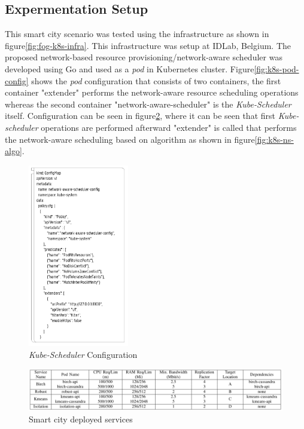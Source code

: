 \subsection{Expermentation Setup}
\label{sec:setup}
This smart city scenario was tested using the infrastructure as shown in figure\ref{fig:fog-k8s-infra}. This infrastructure was setup at IDLab, Belgium\cite{Santos2019}. The proposed network-based resource provisioning/network-aware scheduler was developed using Go and used as a \emph{pod} in Kubernetes cluster\cite{Santos2019}. Figure\ref{fig:k8s-pod-config} shows the \emph{pod} configuration that consists of two containers, the first container "extender" performs the network-aware resource scheduling operations whereas the second container "network-aware-scheduler" is the \emph{Kube-Scheduler} itself\cite{Santos2019}. Configuration can be seen in figure\ref{fig:k8s-sch-config}, where it can be seen that first \emph{Kube-scheduler} operations are performed afterward "extender" is called that performs the network-aware scheduling based on algorithm as shown in figure\ref{fig:k8s-ns-algo}. \par
\begin{figure}
  \centering
  \includegraphics[width=\linewidth, height=8cm]{figures/mlcn-k8s-scheduler-config.pdf}
  \caption{\emph{Kube-Scheduler} Configuration\cite{Santos2019}}
  \label{fig:k8s-sch-config}
\end{figure}
\begin{figure}
  \includegraphics[width=\linewidth]{figures/mlcn-k8s-service-pods.pdf}
  \caption{Smart city deployed services\cite{Santos2019}}
  \label{fig:k8s-sch-config}
\end{figure}
